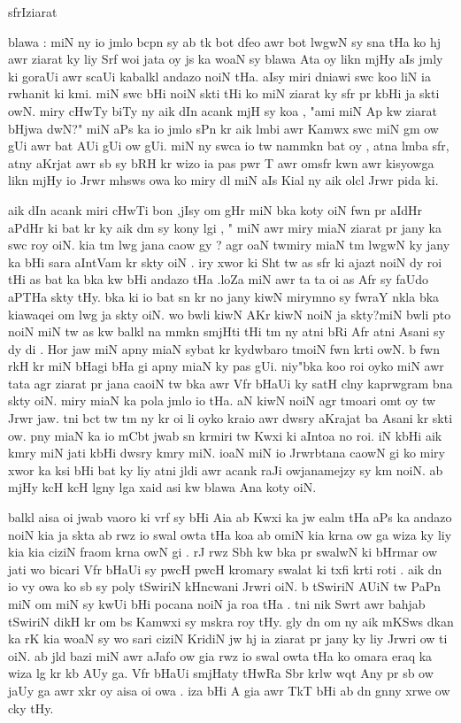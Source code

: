 \documentclass[a4paper]{article}
\begin{document}
\startUrdu
\begin{center}{\LARGE sfrIziarat}\end{center}

blawa :
miN ny io jmlo bcpn sy ab tk bot dfeo awr bot lwgwN sy sna tHa ko hj awr ziarat ky liy Srf woi  jata oy js ka woaN sy blawa Ata oy likn mjHy aIs jmly ki goraUi awr scaUi kabalkl andazo noiN tHa.
aIsy miri dniawi swc koo liN ia rwhanit ki kmi.
miN swc bHi noiN skti tHi ko miN ziarat ky sfr pr kbHi ja skti owN.
miry cHwTy biTy ny aik dIn acank mjH sy koa , "ami miN Ap kw ziarat bHjwa dwN?"      miN  aPs ka io jmlo sPn kr aik lmbi awr Kamwx swc miN gm ow gUi awr bat AUi gUi ow gUi.
miN ny swca io tw nammkn bat oy , atna lmba sfr, atny aKrjat awr sb sy bRH kr wizo  ia  pas pwr T    awr omsfr kwn awr kisyowga likn mjHy io Jrwr mhsws owa ko miry dl miN aIs Kial ny aik olcl Jrwr pida ki.

aik dIn acank miri cHwTi bon ,jIsy om gHr miN bka koty oiN fwn pr aIdHr aPdHr ki bat kr ky aik dm sy kony lgi , " miN awr miry miaN ziarat pr jany ka swc roy oiN.
kia tm lwg jana caow gy ? agr oaN  twmiry miaN  tm       lwgwN ky jany ka bHi  sara    aIntVam        kr skty   oiN .
iry   xwor ki Sht tw as sfr ki ajazt noiN dy roi tHi  as bat ka bka kw bHi andazo tHa .loZa miN awr ta ta oi  as
Afr sy faUdo aPTHa skty tHy.
bka ki io bat sn kr  no jany kiwN mirymno sy fwraY nkla bka kiawaqei om lwg ja skty oiN.
wo bwli kiwN AKr kiwN noiN ja skty?miN bwli pto noiN miN tw as kw balkl na mmkn smjHti tHi tm ny atni bRi Afr atni Asani sy dy di .
Hor jaw miN apny miaN sybat kr kydwbaro tmoiN fwn krti owN.
b fwn rkH kr miN bHagi bHa  gi apny                    miaN ky pas gUi.
niy"bka koo roi oyko miN awr   tata         agr ziarat pr jana caoiN tw bka awr Vfr bHaUi ky satH clny kaprwgram bna skty oiN.
miry miaN ka pola jmlo io tHa.
aN kiwN noiN agr tmoari omt oy tw Jrwr jaw.
tni bct tw tm ny kr oi li oyko kraio awr dwsry aKrajat ba Asani kr skti ow.
pny miaN ka io mCbt jwab sn krmiri tw Kwxi ki aIntoa no roi.
iN kbHi aik kmry miN jati kbHi dwsry kmry miN.
ioaN miN io Jrwrbtana caowN gi ko miry xwor ka ksi bHi bat ky liy atni jldi awr acank raJi owjanamejzy sy km noiN.
ab mjHy kcH kcH lgny lga xaid asi kw blawa Ana koty oiN.

balkl aisa  oi jwab vaoro ki vrf sy bHi Aia ab Kwxi ka jw  ealm tHa   aPs  ka andazo noiN kia ja skta ab rwz io swal owta tHa koa  ab omiN kia krna ow ga wiza ky liy kia kia ciziN fraom krna owN gi .
rJ rwz Sbh kw bka pr swalwN ki bHrmar  ow jati wo bicari Vfr bHaUi sy pwcH pwcH kromary swalat ki txfi krti roti .
aik dn io vy owa ko sb sy poly tSwiriN kHncwani Jrwri oiN.
b tSwiriN AUiN tw PaPn miN om miN sy kwUi bHi pocana noiN ja roa tHa .
tni nik Swrt awr bahjab  tSwiriN dikH kr om bs  Kamwxi sy mskra roy tHy.
gly dn om ny aik mKSws dkan ka rK kia woaN sy wo sari ciziN KridiN jw hj ia ziarat pr jany ky liy Jrwri ow ti oiN.
ab jld bazi  miN awr aJafo ow gia rwz io swal owta tHa ko omara eraq ka wiza lg kr kb AUy ga.
Vfr bHaUi smjHaty tHwRa Sbr krlw wqt Any pr sb ow jaUy ga awr xkr oy aisa oi owa .
iza bHi A    gia awr TkT bHi ab dn gnny xrwe ow cky tHy.
\end{document}
